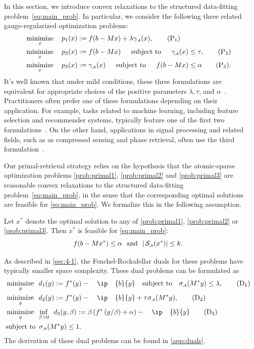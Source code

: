 In this section, we introduce convex relaxations to the structured data-fitting problem~\eqref{eq:main_prob}. In particular, 
we consider the following three related gauge-regularized optimization
problems:
\begin{align} 
  & \displaystyle\mathop{\hbox{\rm minimize}}_{x}\enspace\enspace p_1(x) := f(b - Mx) + \lambda\gamma_{\scriptscriptstyle\mathcal{A}}(x), \label{prob:primal1} \tag{P$_1$} \\
  & \displaystyle\mathop{\hbox{\rm minimize}}_{x}\enspace\enspace p_2(x) := f(b - Mx) \enspace\hbox{\quad subject to\quad}\enspace \gamma_{\scriptscriptstyle\mathcal{A}}(x) \leq \tau, \label{prob:primal2} \tag{P$_2$} \\
  & \displaystyle\mathop{\hbox{\rm minimize}}_{x}\enspace\enspace p_3(x) := \gamma_{\scriptscriptstyle\mathcal{A}}(x)  \enspace\hbox{\quad subject to\quad}\enspace f(b - Mx) \leq \alpha \label{prob:primal3} \tag{P$_3$}. 
\end{align}
It's well known that under mild conditions, these three formulations are equivalent for appropriate choices of the positive parameters $\lambda, \tau$, and $\alpha$~\cite{FrieTsen:2006}. Practitioners often prefer one of these formulations depending on their application. For example, tasks related to machine learning, including feature selection and recommender systems, typically feature one of the first two formulations~\cite{tibshirani1996regression,yul06,Meinshausen06}.  On the other hand, applications in signal processing and related fields, such as as compressed sensing and phase retrieval, often use the third formulation~\cite{berg2008probing,candes:2013}. 

Our primal-retrieval strategy relies on the hypothesis that the atomic-sparse optimization problems \eqref{prob:primal1}, \eqref{prob:primal2} and \eqref{prob:primal3} are reasonable convex relaxations to the structured data-fitting problem~\eqref{eq:main_prob}, in the sense that the corresponding optimal solutions are feasible for \eqref{eq:main_prob}. We formalize this in the following assumption.

\begin{assumption} \label{ass:blanket}
  Let $x^*$ denote the optimal solution to any of \eqref{prob:primal1}, \eqref{prob:primal2} or \eqref{prob:primal3}. Then $x^*$ is feasible for \eqref{eq:main_prob}: 
  \[f(b - Mx^*) \leq \alpha \enspace\mathop{\hbox{\rm and}}\enspace |\operatorname{\mathcal{S}_{\scriptscriptstyle\mathcal{A}}}(x^*)| \leq k.\]
\end{assumption}

As described in \autoref{sec:4-1}, the Fenchel-Rockafellar duals for these problems have typically smaller space complexity. These dual problems can be formulated as
\begin{align} 
  & \minimize{y}  d_1(y) := f^*(y) - \ip{b}{y} \text{subject to} \sigma\As(M^*y) \leq \lambda, \label{prob:dual1} \tag{D$_1$}\\
  & \minimize{y} d_2(y) := f^*(y) - \ip{b}{y} + \tau\sigma\As(M^*y), \label{prob:dual2} \tag{D$_2$}\\
  & \minimize{y} \inf_{\beta > 0} \enspace d_3(y, \beta)
    := \beta \left(
      f^*\left( y/\beta \right) + \alpha
    \right) - \ip{b}{y} \label{prob:dual3} \tag{D$_3$}\\
  & \mbox{subject to}\enspace \sigma\As(M^* y) \leq 1. \nonumber
\end{align}
The derivation of these dual problems can be found in \autoref{app:duals}. 

